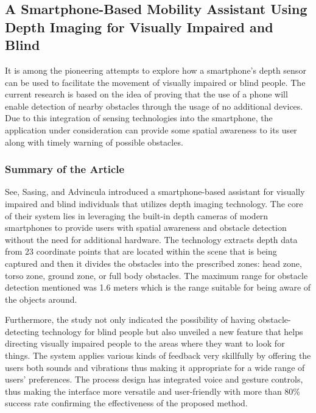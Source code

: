 \documentclass{FastFyp}
\begin{document}
\subsection{A Smartphone-Based Mobility Assistant Using Depth Imaging for Visually Impaired and Blind}
It is among the pioneering attempts to explore how a smartphone’s depth sensor can be used to facilitate the movement of visually impaired or blind people. The current research is based on the idea of proving that the use of a phone will enable detection of nearby obstacles through the usage of no additional devices. Due to this integration of sensing technologies into the smartphone, the application under consideration can provide some spatial awareness to its user along with timely warning of possible obstacles.
\subsubsection{Summary of the Article}  
See, Sasing, and Advincula \cite{ref:see2022smartphone} introduced a smartphone-based assistant for visually impaired and blind individuals that utilizes depth imaging technology. The core of their system lies in leveraging the built-in depth cameras of modern smartphones to provide users with spatial awareness and obstacle detection without the need for additional hardware. The technology extracts depth data from 23 coordinate points that are located within the scene that is being captured and then it divides the obstacles into the prescribed zones: head zone, torso zone, ground zone, or full body obstacles. The maximum range for obstacle detection mentioned was 1.6 meters which is the range suitable for being aware of the objects around.

Furthermore, the study not only indicated the possibility of having obstacle-detecting technology for blind people but also unveiled a new feature that helps directing visually impaired people to the areas where they want to look for things. The system applies various kinds of feedback very skillfully by offering the users both sounds and vibrations thus making it appropriate for a wide range of users' preferences. The process design has integrated voice and gesture controls, thus making the interface more versatile and user-friendly with more than 80\% success rate confirming the effectiveness of the proposed method.
\end{document}
